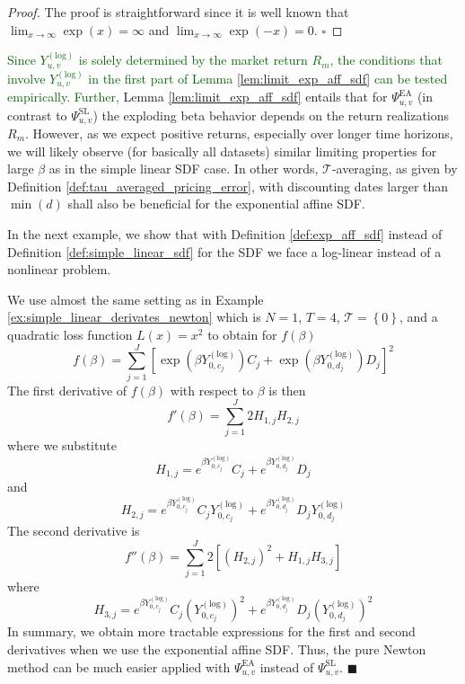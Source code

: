 \begin{proof}
	The proof is straightforward since it is well known that $\lim_{x \to \infty} \exp(x) = \infty$ and $\lim_{x \to \infty} \exp(-x) = 0$. $\square$
\end{proof}


\textcolor{darkgreen}{
	Since $Y_{u,v}^{(\mathrm{log})}$ is solely determined by the market return $R_{m}$, the conditions that involve $Y_{u,v}^{(\mathrm{log})}$ in the first part of Lemma \ref{lem:limit_exp_aff_sdf} can be tested empirically.
	Further,} Lemma \ref{lem:limit_exp_aff_sdf} entails that for $\Psi_{u,v}^{\mathrm{EA}}$ (in contrast to $\Psi_{u,v}^{\mathrm{SL}}$) the exploding beta behavior depends on the return realizations $R_m$.
However, as we expect positive returns, especially over longer time horizons, we will likely observe (for basically all datasets) similar limiting properties for large $\beta$ as in the simple linear SDF case.
In other words, $\mathcal{T}$-averaging, as given by Definition \ref{def:tau_averaged_pricing_error}, with discounting dates larger than $\min(d)$ shall also be beneficial for the exponential affine SDF.

In the next example, we show that with Definition \ref{def:exp_aff_sdf} instead of Definition \ref{def:simple_linear_sdf} for the SDF we face a log-linear instead of a nonlinear problem.

\begin{example}
	We use almost the same setting as in Example \ref{ex:simple_linear_derivates_newton} which is $N=1$, $T=4$, $\mathcal{T} = \left\{ 0 \right\}$, and a quadratic loss function $L(x)=x^2$ to obtain for $f(\beta)$
	\[
	f(\beta) = 
	\sum_{j=1}^J \left[
	\exp( \beta Y_{0, c_{j}}^{(\mathrm{log})} ) C_{j} + 
	\exp( \beta Y_{0, d_{j}}^{(\mathrm{log})} ) D_{j}
	\right]^2
	\]
	The first derivative of $f(\beta)$ with respect to $\beta$ is then
	\[
	f'(\beta) = 
	\sum_{j=1}^J 2 H_{1,j} H_{2,j}
	\]
	where we substitute
	\[
	H_{1,j} = 	
	e^{\beta Y_{0, c_{j}}^{(\mathrm{log})}} C_{j} + 
	e^{\beta Y_{0, d_{j}}^{(\mathrm{log})}} D_{j}
	\]
	and
	\[
	H_{2,j} =
	e^{\beta Y_{0, c_{j}}^{(\mathrm{log})}} C_{j} Y_{0, c_{j}}^{(\mathrm{log})} + 
	e^{\beta Y_{0, d_{j}}^{(\mathrm{log})}} D_{j} Y_{0, d_{j}}^{(\mathrm{log})}
	\]
	The second derivative is
	\[
	f''(\beta) = \sum_{j=1}^J 2
	\left[
	\left( H_{2,j} \right)^2 + H_{1,j} H_{3,j}
	\right]
	\]
	where 
	\[
	H_{3,j} = 
	e^{\beta Y_{0, c_{j}}^{(\mathrm{log})}} C_{j} \left( Y_{0, c_{j}}^{(\mathrm{log})} \right)^2 + 
	e^{\beta Y_{0, d_{j}}^{(\mathrm{log})}} D_{j} \left( Y_{0, d_{j}}^{(\mathrm{log})} \right)^2
	\]
	In summary, we obtain more tractable expressions for the first and second derivatives when we use the exponential affine SDF.
	Thus, the pure Newton method can be much easier applied with $\Psi_{u, v}^{\mathrm{EA}}$ instead of $\Psi_{u, v}^{\mathrm{SL}}$.
	$\blacksquare$
\end{example}

